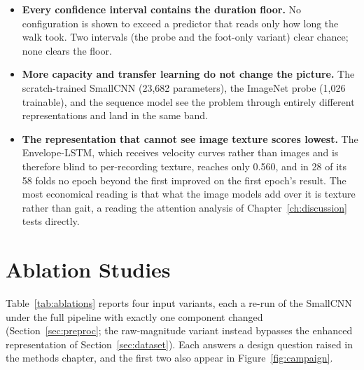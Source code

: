 \begin{itemize}
  \item \textbf{Every confidence interval contains the duration floor.} No
        configuration is shown to exceed a predictor that reads only how long
        the walk took. Two intervals (the probe and the foot-only variant)
        clear chance; none clears the floor.
  \item \textbf{More capacity and transfer learning do not change the
        picture.} The scratch-trained SmallCNN (23{,}682 parameters), the
        ImageNet probe (1{,}026 trainable), and the sequence model see the
        problem through entirely different representations and land in the
        same band.
  \item \textbf{The representation that cannot see image texture scores
        lowest.} The Envelope-LSTM, which receives velocity curves rather
        than images and is therefore blind to per-recording texture, reaches
        only 0.560, and in 28 of its 58 folds no epoch beyond the first
        improved on the first epoch's result. The most economical reading is
        that what the image models add over it is texture rather than gait,
        a reading the attention analysis of Chapter~\ref{ch:discussion}
        tests directly.
\end{itemize}

\section{Ablation Studies}
\label{sec:res-ablations}

Table~\ref{tab:ablations} reports four input variants, each a re-run of the
SmallCNN under the full pipeline with exactly one component changed
(Section~\ref{sec:preproc}; the raw-magnitude variant instead bypasses the
enhanced representation of Section~\ref{sec:dataset}). Each answers a design
question raised in the methods chapter, and the first two also appear in
Figure~\ref{fig:campaign}.

